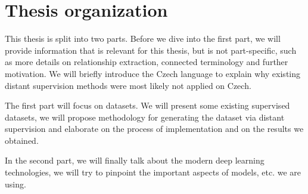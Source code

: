 \section*{Thesis organization}
This thesis is split into two parts. Before we dive into the first part, we will provide information that is relevant for this thesis, but is not part-specific, such as more details on relationship extraction, connected terminology and further motivation. We will briefly introduce the Czech language to explain why existing distant supervision methods were most likely not applied on Czech. 

The first part will focus on datasets. We will present some existing supervised datasets, we will propose methodology for generating the dataset via distant supervision and elaborate on the process of implementation and on the results we obtained.   

In the second part, we will finally talk about the modern deep learning technologies, we will try to pinpoint the important aspects of models, etc. we are using. 

 
